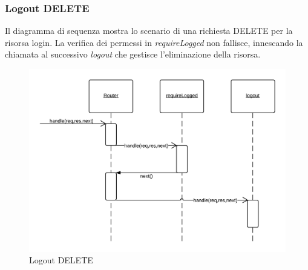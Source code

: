 \subsubsection{Logout DELETE}
Il diagramma di sequenza mostra lo scenario di una richiesta DELETE per la risorsa login.
La verifica dei permessi in \emph{requireLogged} non fallisce, innescando la chiamata al successivo  \emph{logout} che gestisce l'eliminazione della risorsa.
\begin{figure}[H]
	\begin{center} 
		\includegraphics[scale=0.20]{scenari/logout DELETE.png} 
		\caption{Logout DELETE}
	\end{center} 
\end{figure}

